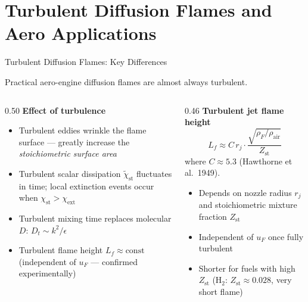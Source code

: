 \documentclass[12pt,aspectratio=169]{beamer}
\newcommand{\Zst}{Z_{\text{st}}}
\newcommand{\chiext}{\chi_{\text{ext}}}
\newcommand{\Lf}{L_f}
\begin{document}
\section{Turbulent Diffusion Flames and Aero Applications}

\begin{frame}{Turbulent Diffusion Flames: Key Differences}

  Practical aero-engine diffusion flames are almost always turbulent.

  \begin{columns}[t]
    \begin{column}{0.50\textwidth}
      \textbf{Effect of turbulence}
      \begin{itemize}
        \item Turbulent eddies wrinkle the flame surface ---
              greatly increase the \emph{stoichiometric surface area}
        \item Turbulent scalar dissipation
              $\tilde{\chi}_{\text{st}}$ fluctuates in time;
              local extinction events occur when
              $\chi_{\text{st}} > \chiext$
        \item Turbulent mixing time replaces molecular $D$:
              $D_t \sim k^2/\epsilon$
        \item Turbulent flame height $\Lf \approx \text{const}$
              (independent of $u_F$ --- confirmed experimentally)
      \end{itemize}
    \end{column}
    \begin{column}{0.46\textwidth}
      \textbf{Turbulent jet flame height}
      \[
        \Lf \approx C\,r_j \cdot
        \frac{\sqrt{\rho_F/\rho_{\text{air}}}}{\Zst}
      \]
      where $C \approx 5.3$ (Hawthorne et al.\ 1949).

      \vspace{4pt}
      \begin{itemize}
        \item Depends on nozzle radius $r_j$ and
              stoichiometric mixture fraction $\Zst$
        \item Independent of $u_F$ once fully turbulent
        \item Shorter for fuels with high $\Zst$
              (H$_2$: $\Zst \approx 0.028$, very short flame)
      \end{itemize}
    \end{column}
  \end{columns}
\end{frame}
\end{document}
